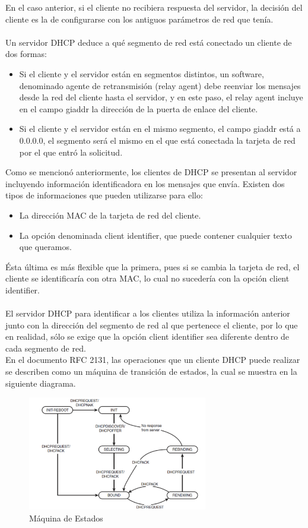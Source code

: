 		En el caso anterior, si el cliente no recibiera respuesta del servidor, la decisión del cliente es la de configurarse con los antiguos parámetros de red que tenía.\\\\
		Un servidor DHCP deduce a qué segmento de red está conectado un cliente de dos formas:
			\begin{itemize}
				\item Si el cliente y el servidor están en segmentos distintos, un software, denominado agente de retransmisión (relay agent) debe reenviar los mensajes desde la red del cliente hasta el servidor, y en este paso, el relay agent incluye en el campo giaddr la dirección de la puerta de enlace del cliente.
				\item Si el cliente y el servidor están en el mismo segmento, el campo giaddr está a 0.0.0.0, el segmento será el mismo en el que está conectada la tarjeta de red por el que entró la solicitud.
			\end{itemize}
Como se mencionó anteriormente, los clientes de DHCP se presentan al servidor incluyendo información identificadora en los mensajes que envía. Existen dos tipos de informaciones que pueden utilizarse para ello:
	\begin{itemize}
		\item La dirección MAC de la tarjeta de red del cliente.
		\item La opción denominada client identifier, que puede contener cualquier texto que queramos.
	\end{itemize}

Ésta última es más flexible que la primera, pues si se cambia la tarjeta de red, el cliente se identificaría con otra MAC, lo cual no sucedería con la opción client identifier.\\\\
El servidor DHCP para identificar a los clientes utiliza la información anterior junto con la dirección del segmento de red al que pertenece el cliente, por lo que en realidad, sólo se exige que la opción client identifier sea diferente dentro de cada segmento de red.\\
En el documento RFC 2131, las operaciones que un cliente DHCP puede realizar se describen como un máquina de transición de estados, la cual se muestra en la siguiente diagrama.\\

\begin{figure}
  \centering
    \includegraphics[width=0.7\textwidth]{img/maquinaEstados}
  \caption{Máquina de Estados}
  \label{fig:1}
\end{figure}

